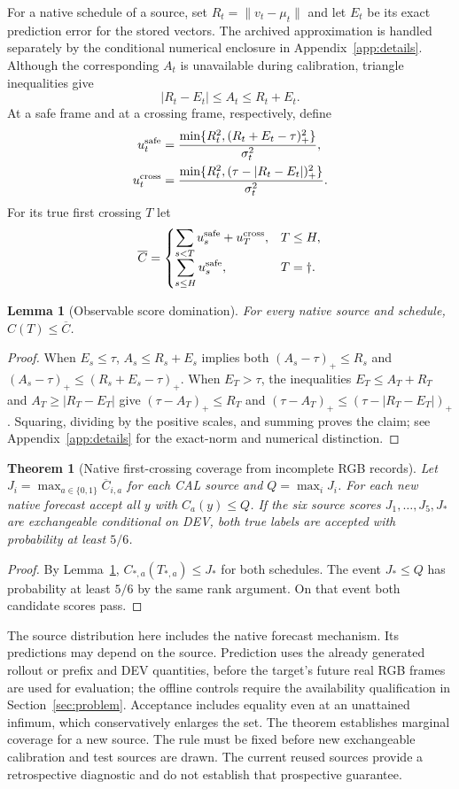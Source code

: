 \documentclass[11pt]{article}
\theoremstyle{noteplain}
\newtheorem{lemma}{Lemma}
\newtheorem{theorem}{Theorem}
\newcommand{\norm}[1]{\lVert #1\rVert}
\newcommand{\dd}{\dagger}
\begin{document}
For a native schedule of a source, set $R_t=\norm{v_t-\mu_t}$ and let $E_t$ be its exact prediction error for the stored vectors. The archived approximation is handled separately by the conditional numerical enclosure in Appendix~\ref{app:details}. Although the corresponding $A_t$ is unavailable during calibration, triangle inequalities give
\[
 |R_t-E_t|\le A_t\le R_t+E_t.
\]
At a safe frame and at a crossing frame, respectively, define
\begin{align*}
 u_t^{\rm safe}&=\frac{\min\{R_t^2,(R_t+E_t-\tau)_+^2\}}{\sigma_t^2},\\
 u_t^{\rm cross}&=\frac{\min\{R_t^2,(\tau-|R_t-E_t|)_+^2\}}{\sigma_t^2}.
\end{align*}
For its true first crossing $T$ let
\[
 \overline C=
 \begin{cases}
 \displaystyle\sum_{s<T}u_s^{\rm safe}+u_T^{\rm cross},&T\le H,\\[3pt]
 \displaystyle\sum_{s\le H}u_s^{\rm safe},&T=\dd .
 \end{cases}
\]
\begin{lemma}[Observable score domination]\label{lem:majorant}
For every native source and schedule, $C(T)\le\overline C$.
\end{lemma}
\begin{proof}
When $E_s\le\tau$, $A_s\le R_s+E_s$ implies both
$(A_s-\tau)_+\le R_s$ and
$(A_s-\tau)_+\le(R_s+E_s-\tau)_+$.
When $E_T>\tau$, the inequalities $E_T\le A_T+R_T$ and
$A_T\ge|R_T-E_T|$ give
$(\tau-A_T)_+\le R_T$ and
$(\tau-A_T)_+\le(\tau-|R_T-E_T|)_+$.
Squaring, dividing by the positive scales, and summing proves the claim; see Appendix~\ref{app:details} for the exact-norm and numerical distinction.
\end{proof}
\begin{theorem}[Native first-crossing coverage from incomplete RGB records]\label{thm:event}
Let $J_i=\max_{a\in\{0,1\}}\overline C_{i,a}$ for each CAL source and $Q=\max_i J_i$. For each new native forecast accept all $y$ with $C_a(y)\le Q$. If the six source scores $J_1,\ldots,J_5,J_*$ are exchangeable conditional on DEV, both true labels are accepted with probability at least $5/6$.
\end{theorem}
\begin{proof}
By Lemma~\ref{lem:majorant}, $C_{*,a}(T_{*,a})\le J_*$ for both schedules. The event $J_*\le Q$ has probability at least $5/6$ by the same rank argument. On that event both candidate scores pass.
\end{proof}
The source distribution here includes the native forecast mechanism. Its predictions may depend on the source. Prediction uses the already generated rollout or prefix and DEV quantities, before the target's future real RGB frames are used for evaluation; the offline controls require the availability qualification in Section~\ref{sec:problem}. Acceptance includes equality even at an unattained infimum, which conservatively enlarges the set. The theorem establishes marginal coverage for a new source. The rule must be fixed before new exchangeable calibration and test sources are drawn. The current reused sources provide a retrospective diagnostic and do not establish that prospective guarantee.
\end{document}
